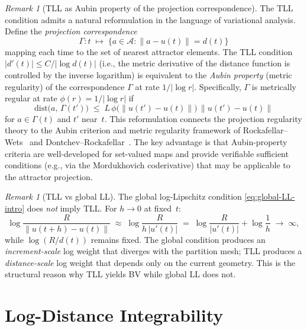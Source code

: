 \documentclass[12pt,a4paper]{article}
\theoremstyle{definition}
\theoremstyle{plain}
\theoremstyle{remark}
\newtheorem{remark}[definition]{Remark}
\newcommand{\dist}{\mathrm{dist}}
\begin{document}
\begin{remark}[TLL as Aubin property of the projection correspondence]
\label{rem:TLL-Aubin}
The TLL condition admits a natural reformulation in the language of
variational analysis.  Define the \emph{projection correspondence}
\[
  \Gamma: t \;\mapsto\;
  \bigl\{a \in \mathcal{A} : \|a - u(t)\| = d(t)\bigr\}
\]
mapping each time to the set of nearest attractor elements.
The TLL condition $|d'(t)| \le C/|\log d(t)|$
(i.e., the metric derivative of the distance function is controlled
by the inverse logarithm) is equivalent to the
\emph{Aubin property} (metric regularity) of the correspondence
$\Gamma$ at rate $1/|\log r|$.  Specifically, $\Gamma$ is
metrically regular at rate $\phi(r) = 1/|\log r|$ if
\[
  \dist\bigl(a,\, \Gamma(t')\bigr)
  \;\le\;
  L\,\phi\bigl(\|u(t') - u(t)\|\bigr)\,\|u(t') - u(t)\|
\]
for $a \in \Gamma(t)$ and $t'$ near~$t$.
This reformulation connects the projection regularity theory to the
Aubin criterion and metric regularity framework of
Rockafellar--Wets~\cite{RockafellarWets1998} and
Dontchev--Rockafellar~\cite{DontchevRockafellar2009}.
The key advantage is that Aubin-property criteria are
well-developed for set-valued maps and provide verifiable sufficient
conditions (e.g., via the Mordukhovich coderivative) that may be
applicable to the attractor projection.
\end{remark}

\begin{remark}[TLL vs global LL]
\label{rem:TLL-vs-LL}
The global log-Lipschitz condition \eqref{eq:global-LL-intro}
does \emph{not} imply TLL.  For $h \to 0$ at fixed~$t$:
\[
  \log\frac{R}{\|u(t+h)-u(t)\|}
  \;\approx\;
  \log\frac{R}{h\,|u'(t)|}
  \;=\;
  \log\frac{R}{|u'(t)|} + \log\frac{1}{h}
  \;\to\; \infty,
\]
while $\log(R/d(t))$ remains fixed.  The global condition
produces an \emph{increment-scale} log weight that diverges
with the partition mesh; TLL produces a \emph{distance-scale}
log weight that depends only on the current geometry.
This is the structural reason why TLL yields BV while
global LL does not.
\end{remark}


\section{Log-Distance Integrability}
\label{sec:LDI}
\end{document}

